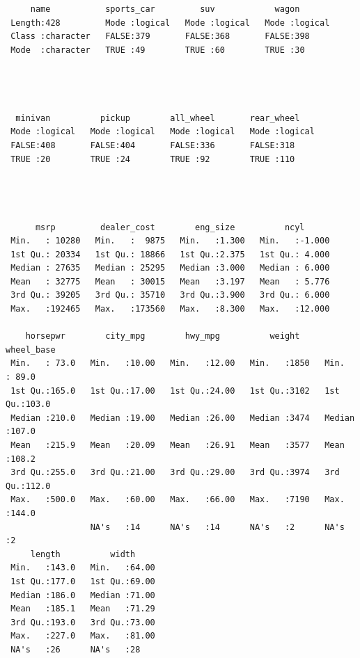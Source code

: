 \documentclass[
  letterpaper,
]{book}
\begin{document}
\begin{verbatim}
     name           sports_car         suv            wagon        
 Length:428         Mode :logical   Mode :logical   Mode :logical  
 Class :character   FALSE:379       FALSE:368       FALSE:398      
 Mode  :character   TRUE :49        TRUE :60        TRUE :30       
                                                                   
                                                                   
                                                                   
                                                                   
  minivan          pickup        all_wheel       rear_wheel     
 Mode :logical   Mode :logical   Mode :logical   Mode :logical  
 FALSE:408       FALSE:404       FALSE:336       FALSE:318      
 TRUE :20        TRUE :24        TRUE :92        TRUE :110      
                                                                
                                                                
                                                                
                                                                
      msrp         dealer_cost        eng_size          ncyl       
 Min.   : 10280   Min.   :  9875   Min.   :1.300   Min.   :-1.000  
 1st Qu.: 20334   1st Qu.: 18866   1st Qu.:2.375   1st Qu.: 4.000  
 Median : 27635   Median : 25295   Median :3.000   Median : 6.000  
 Mean   : 32775   Mean   : 30015   Mean   :3.197   Mean   : 5.776  
 3rd Qu.: 39205   3rd Qu.: 35710   3rd Qu.:3.900   3rd Qu.: 6.000  
 Max.   :192465   Max.   :173560   Max.   :8.300   Max.   :12.000  
                                                                   
    horsepwr        city_mpg        hwy_mpg          weight       wheel_base   
 Min.   : 73.0   Min.   :10.00   Min.   :12.00   Min.   :1850   Min.   : 89.0  
 1st Qu.:165.0   1st Qu.:17.00   1st Qu.:24.00   1st Qu.:3102   1st Qu.:103.0  
 Median :210.0   Median :19.00   Median :26.00   Median :3474   Median :107.0  
 Mean   :215.9   Mean   :20.09   Mean   :26.91   Mean   :3577   Mean   :108.2  
 3rd Qu.:255.0   3rd Qu.:21.00   3rd Qu.:29.00   3rd Qu.:3974   3rd Qu.:112.0  
 Max.   :500.0   Max.   :60.00   Max.   :66.00   Max.   :7190   Max.   :144.0  
                 NA's   :14      NA's   :14      NA's   :2      NA's   :2      
     length          width      
 Min.   :143.0   Min.   :64.00  
 1st Qu.:177.0   1st Qu.:69.00  
 Median :186.0   Median :71.00  
 Mean   :185.1   Mean   :71.29  
 3rd Qu.:193.0   3rd Qu.:73.00  
 Max.   :227.0   Max.   :81.00  
 NA's   :26      NA's   :28     
\end{verbatim}
\end{document}
